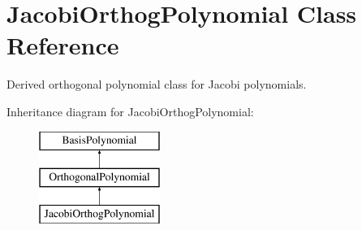 \section{Jacobi\+Orthog\+Polynomial Class Reference}
\label{classPecos_1_1JacobiOrthogPolynomial}


Derived orthogonal polynomial class for Jacobi polynomials.  


Inheritance diagram for Jacobi\+Orthog\+Polynomial\+:\begin{figure}[H]
\begin{center}
\leavevmode
\includegraphics[height=3.000000cm]{classPecos_1_1JacobiOrthogPolynomial}
\end{center}
\end{figure}
